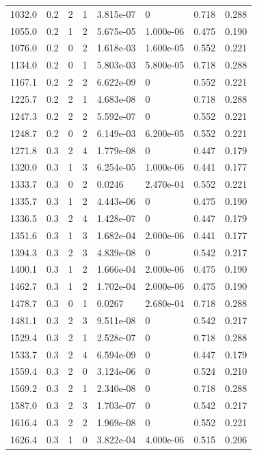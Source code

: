 \documentclass[preview]{standalone}
\begin{document}
{{{\begin{tabular}{L{1.2cm}C{1.2cm} C{0.3cm}C{0.5cm} C{1.4cm}C{1.4cm} C{1.4cm}C{1.4cm}}
  1032.0  &   0.2  & 2     &  1 &  3.815e-07  & 0  & 0.718 &  0.288   \\ 
  1055.0  &   0.2  & 1     &  2 &  5.675e-05  & 1.000e-06  & 0.475 &  0.190   \\ 
  1076.0  &   0.2  & 0     &  2 &  1.618e-03  & 1.600e-05  & 0.552 &  0.221   \\ 
  1134.0  &   0.2  & 0     &  1 &  5.803e-03  & 5.800e-05  & 0.718 &  0.288   \\ 
  1167.1  &   0.2  & 2     &  2 &  6.622e-09  & 0  & 0.552 &  0.221   \\ 
  1225.7  &   0.2  & 2     &  1 &  4.683e-08  & 0  & 0.718 &  0.288   \\ 
  1247.3  &   0.2  & 2     &  2 &  5.592e-07  & 0  & 0.552 &  0.221   \\ 
  1248.7  &   0.2  & 0     &  2 &  6.149e-03  & 6.200e-05  & 0.552 &  0.221   \\ 
  1271.8  &   0.3  & 2     &  4 &  1.779e-08  & 0  & 0.447 &  0.179   \\ 
  1320.0  &   0.3  & 1     &  3 &  6.254e-05  & 1.000e-06  & 0.441 &  0.177   \\ 
  1333.7  &   0.3  & 0     &  2 &  0.0246  & 2.470e-04  & 0.552 &  0.221   \\ 
  1335.7  &   0.3  & 1     &  2 &  4.443e-06  & 0  & 0.475 &  0.190   \\ 
  1336.5  &   0.3  & 2     &  4 &  1.428e-07  & 0  & 0.447 &  0.179   \\ 
  1351.6  &   0.3  & 1     &  3 &  1.682e-04  & 2.000e-06  & 0.441 &  0.177   \\ 
  1394.3  &   0.3  & 2     &  3 &  4.839e-08  & 0  & 0.542 &  0.217   \\ 
  1400.1  &   0.3  & 1     &  2 &  1.666e-04  & 2.000e-06  & 0.475 &  0.190   \\ 
  1462.7  &   0.3  & 1     &  2 &  1.702e-04  & 2.000e-06  & 0.475 &  0.190   \\ 
  1478.7  &   0.3  & 0     &  1 &  0.0267  & 2.680e-04  & 0.718 &  0.288   \\ 
  1481.1  &   0.3  & 2     &  3 &  9.511e-08  & 0  & 0.542 &  0.217   \\ 
  1529.4  &   0.3  & 2     &  1 &  2.528e-07  & 0  & 0.718 &  0.288   \\ 
  1533.7  &   0.3  & 2     &  4 &  6.594e-09  & 0  & 0.447 &  0.179   \\ 
  1559.4  &   0.3  & 2     &  0 &  3.124e-06  & 0  & 0.524 &  0.210   \\ 
  1569.2  &   0.3  & 2     &  1 &  2.340e-08  & 0  & 0.718 &  0.288   \\ 
  1587.0  &   0.3  & 2     &  3 &  1.703e-07  & 0  & 0.542 &  0.217   \\ 
  1616.4  &   0.3  & 2     &  2 &  1.969e-08  & 0  & 0.552 &  0.221   \\ 
  1626.4  &   0.3  & 1     &  0 &  3.822e-04  & 4.000e-06  & 0.515 &  0.206   \\ 
\hline 
\end{tabular} 

}}}
\end{document}
